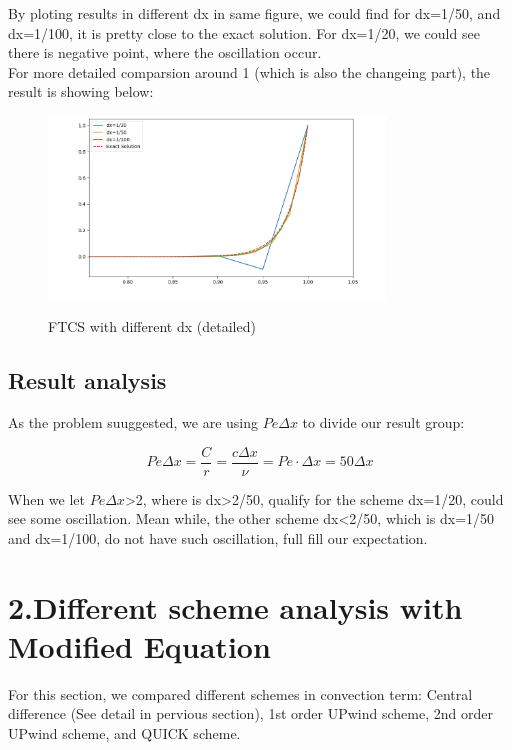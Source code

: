 \documentclass[12pt]{article}
\begin{document}
By ploting results in different dx in same figure, we could
find for dx=1/50, and dx=1/100, it is pretty close to the exact
solution. For dx=1/20, we could see there is negative point, 
where the oscillation occur.\\



For more detailed comparsion around 1 (which is also the 
changeing part), the result is showing below:




\begin{figure}[H]
    \centering
    \includegraphics[width=0.8\textwidth]{figures/P1t0.1AllH.png}
    \label{IGs.jpg}
    \caption{FTCS with different dx (detailed)}
\end{figure}


\subsection{Result analysis}
As the problem suuggested, we are using $Pe\Delta x$ to divide
our result group:

$$
Pe \Delta x = \frac{C}{r} = \frac{c \Delta x}{\nu} = Pe \cdot \Delta x = 50 \Delta x
$$

When we let $Pe\Delta x$>2, where is dx>2/50, qualify for the 
scheme dx=1/20, could see some oscillation. Mean while, the
other scheme dx<2/50, which is dx=1/50 and dx=1/100,
do not have such oscillation, full fill our expectation.




\section{2.Different scheme analysis with Modified Equation}

For this section, we compared different schemes in convection 
term: Central difference (See detail in pervious section), 
1st order UPwind scheme, 2nd order UPwind scheme, and QUICK
scheme.
\end{document}
